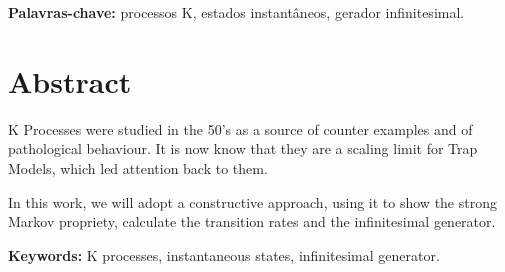 \noindent \textbf{Palavras-chave:} processos K, estados instantâneos,
gerador infinitesimal.

\chapter*{Abstract}

K Processes were studied in the 50's as a source of counter examples
and of pathological behaviour. It is now know that they are a scaling
limit for Trap Models, which led attention back to them.

In this work, we will adopt a constructive approach, using it to show
the strong Markov propriety, calculate the transition rates and
the infinitesimal generator.

\noindent \textbf{Keywords:} K processes, instantaneous states,
infinitesimal generator.


